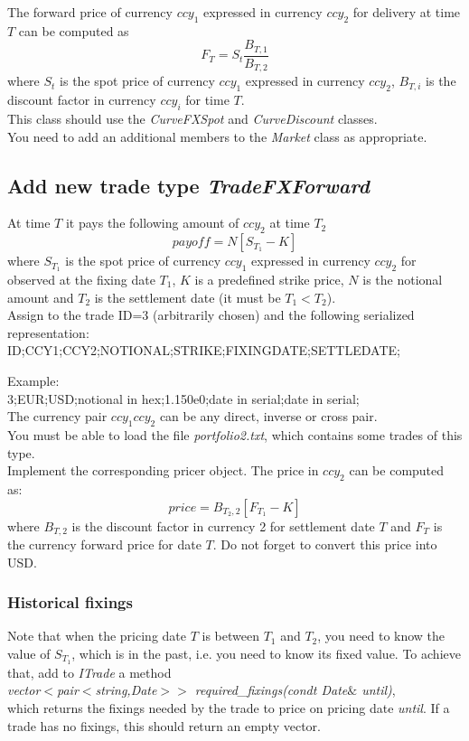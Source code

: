 \documentclass[10pt]{article}
\begin{document}
The forward price of currency $ccy_1$ expressed in currency $ccy_2$ for delivery at time $T$ can be computed as
$$F_T=S_t \frac{B_{T,1}}{B_{T,2}}$$
where $S_t$ is the spot price of currency $ccy_1$ expressed in currency $ccy_2$, $B_{T,i}$ is the discount factor in currency $ccy_i$ for time $T$.\\

This class should use the \textit{CurveFXSpot} and \textit{CurveDiscount} classes.\\

You need to add an additional members to the \textit{Market} class as appropriate.

\subsection{Add new trade type \textit{TradeFXForward}}
At time $T$ it pays the following amount of $ccy_2$ at time $T_2$
$$
payoff=N[S_{T_1}-K]
$$
where $S_{T_1}$ is the spot price of currency $ccy_1$ expressed in currency $ccy_2$ for observed at the fixing date $T_1$, $K$ is a predefined strike price, $N$ is the notional amount and $T_2$ is the settlement date (it must be $T_1<T_2$).\\

Assign to the trade ID=3 (arbitrarily chosen) and the following serialized representation:\\
ID;CCY1;CCY2;NOTIONAL;STRIKE;FIXINGDATE;SETTLEDATE;

\noindent Example:\\
3;EUR;USD;notional in hex;1.150e0;date in serial;date in serial;\\

The currency pair $ccy_1ccy_2$ can be any direct, inverse or cross pair.\\

You must be able to load the file \textit{portfolio2.txt}, which contains some trades of this type.\\

Implement the corresponding pricer object. The price in $ccy_2$ can be computed as:
$$
price=B_{T_2,2}[F_{T_1}-K]
$$
where $B_{T,2}$ is the discount factor in currency 2 for settlement date $T$ and $F_T$ is the currency forward price for date $T$. Do not forget to convert this price into USD.\\

\subsubsection{Historical fixings}
Note that when the pricing date $T$ is between $T_1$ and $T_2$, you need to know the value of $S_{T_1}$, which is in the past, i.e. you need to know its fixed value. To achieve that, add to \textit{ITrade} a method\\
\textit{vector$<$pair$<$string,Date$>>$ required\_fixings(condt Date$\&$ until)},\\
which returns the fixings needed by the trade to price on pricing date \textit{until}. If a trade has no fixings, this should return an empty vector.
\end{document}
